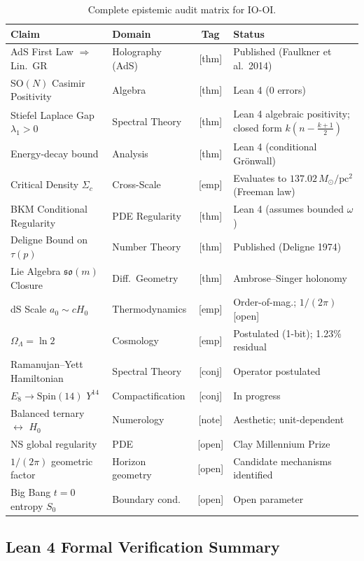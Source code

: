 \documentclass[12pt,letterpaper]{article}
\theoremstyle{plain}
\theoremstyle{definition}
\begin{document}
\begin{table}[h]
\centering
\caption{Complete epistemic audit matrix for IO-OI.}
\label{tab:audit}
\footnotesize
\begin{tabular}{@{}p{4.2cm}p{3.2cm}cp{6.0cm}@{}}
\toprule
\textbf{Claim} & \textbf{Domain} & \textbf{Tag} & \textbf{Status} \\
\midrule
AdS First Law $\Rightarrow$ Lin.\ GR & Holography (AdS) & [thm] & Published (Faulkner et al.\ 2014) \\
SO$(N)$ Casimir Positivity & Algebra & [thm] & Lean 4 (0 errors) \\
Stiefel Laplace Gap $\lambda_1 > 0$ & Spectral Theory & [thm] & Lean 4 algebraic positivity; closed form $k(n-\frac{k+1}{2})$ \\
Energy-decay bound & Analysis & [thm] & Lean 4 (conditional Gr\"onwall) \\
Critical Density $\Sigma_c$ & Cross-Scale & [emp] & Evaluates to $137.02\,M_\odot/\mathrm{pc}^2$ (Freeman law) \\
BKM Conditional Regularity & PDE Regularity & [thm] & Lean 4 (assumes bounded $\omega$) \\
Deligne Bound on $\tau(p)$ & Number Theory & [thm] & Published (Deligne 1974) \\
Lie Algebra $\mathfrak{so}(m)$ Closure & Diff.\ Geometry & [thm] & Ambrose--Singer holonomy \\
dS Scale $a_0 \sim cH_0$ & Thermodynamics & [emp] & Order-of-mag.; $1/(2\pi)$ [open] \\
$\Omega_\Lambda = \ln 2$ & Cosmology & [emp] & Postulated (1-bit); 1.23\% residual \\
Ramanujan--Yett Hamiltonian & Spectral Theory & [conj] & Operator postulated \\
$E_8 \to \mathrm{Spin}(14)$ $Y^{14}$ & Compactification & [conj] & In progress \\
Balanced ternary $\leftrightarrow$ $H_0$ & Numerology & [note] & Aesthetic; unit-dependent \\
NS global regularity & PDE & [open] & Clay Millennium Prize \\
$1/(2\pi)$ geometric factor & Horizon geometry & [open] & Candidate mechanisms identified \\
Big Bang $t=0$ entropy $S_0$ & Boundary cond. & [open] & Open parameter \\
\bottomrule
\end{tabular}
\end{table}
\subsection{Lean 4 Formal Verification Summary}
\end{document}
